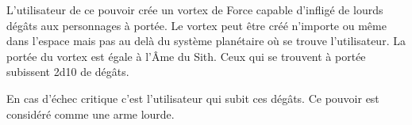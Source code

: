 \begin{description}[align=left]
        L’utilisateur de ce pouvoir crée un vortex de Force capable d’infligé de lourds dégâts aux personnages à portée. Le vortex peut être créé n’importe ou même dans l’espace mais pas au delà du système planétaire où se trouve l’utilisateur. La portée du vortex est égale à l’\^Ame du Sith. Ceux qui se trouvent à portée subissent 2d10 de dégâts.

        En cas d’échec critique c’est l’utilisateur qui subit ces dégâts. Ce pouvoir est considéré comme une arme lourde.
        \\

\end{description}
